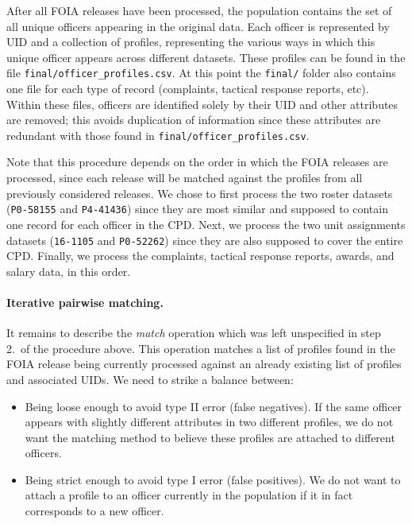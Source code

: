 After all FOIA releases have been processed, the population contains the set of
all unique officers appearing in the original data. Each officer is represented
by UID and a collection of profiles, representing the various ways in which
this unique officer appears across different datasets. These profiles can be
found in the file \texttt{final/officer\_profiles.csv}.
At this point the \texttt{final/} folder also contains
one file for each type of record (complaints, tactical response reports, etc).
Within these files, officers are identified solely by their UID and other attributes
are removed; this avoids duplication of
information since these attributes are redundant with those found in
\texttt{final/officer\_profiles.csv}.

Note that this procedure depends on the order in which the FOIA releases are processed,
since each release will be matched against the profiles from all
previously considered releases. We chose to first process the two roster datasets
(\texttt{P0-58155} and \texttt{P4-41436}) since they are most similar and
supposed to contain one record for each officer in the CPD. Next, we process
the two unit assignments datasets (\texttt{16-1105} and \texttt{P0-52262})
since they are also supposed to cover the entire CPD. Finally, we process the
complaints, tactical response reports, awards, and salary data, in this
order.

\paragraph{Iterative pairwise matching.}
It remains to describe the \emph{match} operation which was left unspecified in
step 2.\ of the procedure above. This operation
matches a list of profiles found in the FOIA release being currently processed
against an already existing list of profiles and associated UIDs. We need to strike a balance between:
\begin{itemize}
	\item Being loose enough to avoid type II error (false negatives). If the
		same officer appears with slightly different attributes in two
		different profiles, we do not want the matching method to believe these
		profiles are attached to different officers.
	\item Being strict enough to avoid type I error (false positives). We do
		not want to attach a profile to an officer currently in the population
		if it in fact corresponds to a new officer.
\end{itemize}

